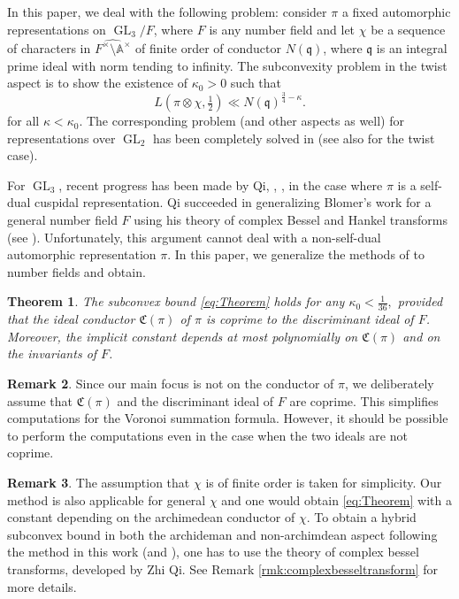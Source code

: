\documentclass[a4paper,11pt]{amsart}
\newtheorem{theorem}{Theorem}[section]
\theoremstyle{definition}
\newtheorem{remark}[theorem]{Remark}
\newcommand{\A}{\mathbb{A}}
\newcommand{\gelle}{\operatorname{GL}}
\begin{document}
In this paper, we deal with the following problem: consider $\pi$ a fixed automorphic representations on $\gelle_3/F$, where $F$ is any number field and let $\chi$ be a sequence of characters in $\widehat{F^{\times}\setminus\A^{\times}}$ of finite order of conductor $N(\mathfrak{q})$, where $\mathfrak{q}$ is an integral prime ideal with norm tending to infinity. The subconvexity problem in the twist aspect is to show the existence of $\kappa_0>0$ such that
\begin{equation}\label{eq:Theorem}L(\pi\otimes \chi,\tfrac{1}{2}) \ll N(\mathfrak{q})^{\frac{3}{4}-\kappa}. \end{equation}for all $\kappa < \kappa_0$. 
The corresponding problem (and other aspects as well) for representations over $\gelle_2$ has been completely solved in \cite{michelvenkatesh} (see also \cite{sparse-equidistribution-venkatesh} for the twist case).

For $\gelle_3$, recent progress has been made by Qi, \cite{Qi2019}, \cite{Qi2024}, in the case where $\pi$ is a self-dual cuspidal representation. Qi succeeded in generalizing Blomer's work \cite{blomersubconvexity} for a general number field $F$ using his theory of complex Bessel and Hankel transforms (see \cite{qi2021theory}). Unfortunately, this argument cannot deal with a non-self-dual automorphic representation $\pi$. In this paper, we generalize the methods of \cite{nelsonholowinsky} to number fields and obtain. 

\begin{theorem}
    The subconvex bound \eqref{eq:Theorem} holds for any $\kappa_0 < \frac{1}{36},$
    provided that the ideal conductor $\mathfrak{C}(\pi)$ of $\pi$ is coprime to the discriminant ideal of $F$. Moreover, the implicit constant depends at most polynomially on $\mathfrak{C}(\pi)$ and on the invariants of $F$.
\end{theorem}

\begin{remark}Since our main focus is not on the conductor of $\pi$, we deliberately assume that $\mathfrak{C}(\pi)$ and the discriminant ideal of $F$ are coprime. This simplifies computations for the Voronoi summation formula. However, it should be possible to perform the computations even in the case when the two ideals are not coprime.  
\end{remark}
\begin{remark}
    The assumption that $\chi$ is of finite order is taken for simplicity. Our method is also applicable for general $\chi$ and one would obtain \eqref{eq:Theorem} with a constant depending on the archimedean conductor of $\chi$. To obtain a hybrid subconvex bound in both the archideman and non-archimdean aspect following the method in this work (and \cite{schumacherphdthesis}), one has to use the theory of complex bessel transforms, developed by Zhi Qi. See Remark \ref{rmk:complexbesseltransform} for more details.
\end{remark}
\end{document}
